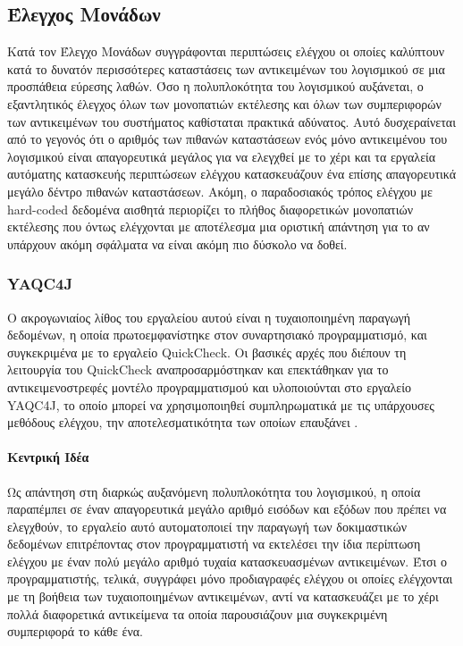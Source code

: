 \documentclass[12pt]{article}
\begin{document}
\subsection{Έλεγχος Μονάδων}
Κατά τον Έλεγχο Μονάδων συγγράφονται περιπτώσεις ελέγχου οι οποίες καλύπτουν κατά το δυνατόν περισσότερες καταστάσεις των αντικειμένων του λογισμικού σε μια προσπάθεια εύρεσης λαθών. Όσο η πολυπλοκότητα του λογισμικού αυξάνεται, ο εξαντλητικός έλεγχος όλων των μονοπατιών εκτέλεσης και όλων των συμπεριφορών των αντικειμένων του συστήματος καθίσταται πρακτικά αδύνατος. Αυτό δυσχεραίνεται από το γεγονός ότι ο αριθμός των πιθανών καταστάσεων ενός μόνο αντικειμένου του λογισμικού είναι απαγορευτικά μεγάλος για να ελεγχθεί με το χέρι και τα εργαλεία αυτόματης κατασκευής περιπτώσεων ελέγχου κατασκευάζουν ένα επίσης απαγορευτικά μεγάλο δέντρο πιθανών καταστάσεων. Ακόμη, ο παραδοσιακός τρόπος ελέγχου με hard-coded δεδομένα αισθητά περιορίζει το πλήθος διαφορετικών μονοπατιών εκτέλεσης που όντως ελέγχονται με αποτέλεσμα μια οριστική απάντηση για το αν υπάρχουν ακόμη σφάλματα να είναι ακόμη πιο δύσκολο να δοθεί.

\subsubsection{YAQC4J}

Ο ακρογωνιαίος λίθος του εργαλείου αυτού είναι η τυχαιοποιημένη παραγωγή δεδομένων, η οποία πρωτοεμφανίστηκε στον συναρτησιακό προγραμματισμό, και συγκεκριμένα με το εργαλείο QuickCheck. Οι βασικές αρχές που διέπουν τη λειτουργία του QuickCheck αναπροσαρμόστηκαν και επεκτάθηκαν για το αντικειμενοστρεφές μοντέλο προγραμματισμού και υλοποιούνται στο εργαλείο YAQC4J, το οποίο μπορεί να χρησιμοποιηθεί συμπληρωματικά με τις υπάρχουσες μεθόδους ελέγχου, την αποτελεσματικότητα των οποίων επαυξάνει \cite{andres}.

\paragraph{Κεντρική Ιδέα} Ως απάντηση στη διαρκώς αυξανόμενη πολυπλοκότητα του λογισμικού, η οποία παραπέμπει σε έναν απαγορευτικά μεγάλο αριθμό εισόδων και εξόδων που πρέπει να ελεγχθούν, το εργαλείο αυτό αυτοματοποιεί την παραγωγή των δοκιμαστικών δεδομένων επιτρέποντας στον προγραμματιστή να εκτελέσει την ίδια περίπτωση ελέγχου με έναν πολύ μεγάλο αριθμό τυχαία κατασκευασμένων αντικειμένων. Έτσι ο προγραμματιστής, τελικά, συγγράφει μόνο προδιαγραφές ελέγχου οι οποίες ελέγχονται με τη βοήθεια των τυχαιοποιημένων αντικειμένων, αντί να κατασκευάζει με το χέρι πολλά διαφορετικά αντικείμενα τα οποία παρουσιάζουν μια συγκεκριμένη συμπεριφορά το κάθε ένα.
\end{document}
